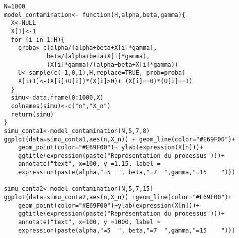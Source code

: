 \documentclass[12pt,a4paper]{report}
\theoremstyle{remark}
\begin{document}
\begin{lstlisting}
N=1000
model_contamination<- function(H,alpha,beta,gamma){
  X<-NULL
  X[1]<-1
  for (i in 1:H){
    proba<-c(alpha/(alpha+beta+X[i]*gamma),
            beta/(alpha+beta+X[i]*gamma),
            (X[i]*gamma)/(alpha+beta+X[i]*gamma))
    U<-sample(c(-1,0,1),H,replace=TRUE, prob=proba)
    X[i+1]<-(X[i]+U[i])*(X[i]>0)+ (X[i]==0)*(U[i]==1)
  }
  simu<-data.frame(0:1000,X)
  colnames(simu)<-c("n","X_n")
  return(simu)
}
simu_conta1<-model_contamination(N,5,7,8)
ggplot(data=simu_conta1,aes(n,X_n)) + geom_line(color="#E69F00")+
    geom_point(color="#E69F00")+ ylab(expression(X[n]))+ 
    ggtitle(expression(paste("Représentation du processus")))+
    annotate("text", x=100, y =1.15, label = 
    expression(paste(alpha,"=5  ", beta,"=7  ",gamma,"=15    ")))

simu_conta2<-model_contamination(N,5,7,15)
ggplot(data=simu_conta2,aes(n,X_n)) +geom_line(color="#E69F00")+
    geom_point(color="#E69F00")+ylab(expression(X[n]))+
    ggtitle(expression(paste("Représentation du processus")))+
    annotate("text", x=100, y =1000, label =
    expression(paste(alpha,"=5  ", beta,"=7  ",gamma,"=15    ")))
\end{lstlisting}
\end{document}

